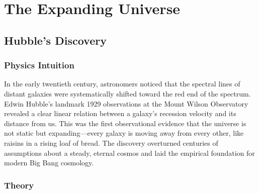 
\chapter{The Expanding Universe}

\section{Hubble's Discovery}

\subsection{Physics Intuition}

\begin{intuition}
In the early twentieth century, astronomers noticed that the spectral lines of distant
galaxies were systematically shifted toward the red end of the spectrum.
Edwin Hubble's landmark 1929 observations at the Mount Wilson Observatory revealed a
clear linear relation between a galaxy's recession velocity and its distance from us.
This was the first observational evidence that the universe is not static but
expanding—every galaxy is moving away from every other, like raisins in a rising loaf
of bread. The discovery overturned centuries of assumptions about a steady, eternal
cosmos and laid the empirical foundation for modern Big Bang cosmology.
\end{intuition}

\subsection{Theory}

